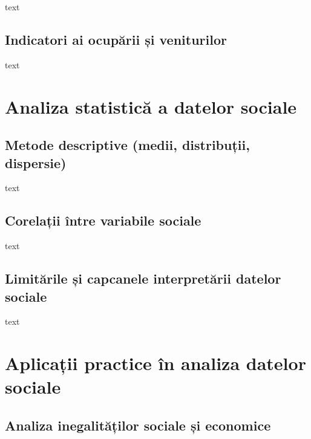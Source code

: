 \documentclass[
  11pt,
  b5paper,
  nottoc]{book}
\begin{document}
text

\hypertarget{indicatori-ai-ocupux103rii-ux219i-veniturilor}{%
\subsection{Indicatori ai ocupării și
veniturilor}\label{indicatori-ai-ocupux103rii-ux219i-veniturilor}}

text

\hypertarget{analiza-statisticux103-a-datelor-sociale}{%
\section{Analiza statistică a datelor
sociale}\label{analiza-statisticux103-a-datelor-sociale}}

\hypertarget{metode-descriptive-medii-distribuux21bii-dispersie}{%
\subsection{Metode descriptive (medii, distribuții,
dispersie)}\label{metode-descriptive-medii-distribuux21bii-dispersie}}

text

\hypertarget{corelaux21bii-uxeentre-variabile-sociale}{%
\subsection{Corelații între variabile
sociale}\label{corelaux21bii-uxeentre-variabile-sociale}}

text

\hypertarget{limitux103rile-ux219i-capcanele-interpretux103rii-datelor-sociale}{%
\subsection{Limitările și capcanele interpretării datelor
sociale}\label{limitux103rile-ux219i-capcanele-interpretux103rii-datelor-sociale}}

text

\hypertarget{aplicaux21bii-practice-uxeen-analiza-datelor-sociale}{%
\section{Aplicații practice în analiza datelor
sociale}\label{aplicaux21bii-practice-uxeen-analiza-datelor-sociale}}

\hypertarget{analiza-inegalitux103ux21bilor-sociale-ux219i-economice}{%
\subsection{Analiza inegalităților sociale și
economice}\label{analiza-inegalitux103ux21bilor-sociale-ux219i-economice}}
\end{document}

